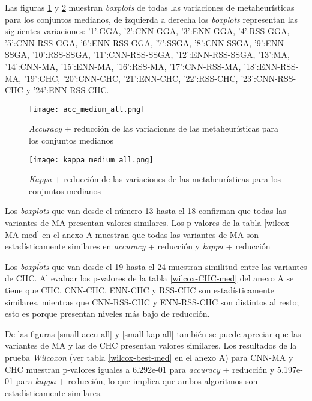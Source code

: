 Las figuras \ref{medium-accu-all} y \ref{medium-kap-all} muestran \emph{boxplots} de todas las variaciones de metaheurísticas para los conjuntos medianos, de izquierda a derecha los \emph{boxplots} representan las siguientes variaciones: '1':GGA, '2':CNN-GGA, '3':ENN-GGA, '4':RSS-GGA, '5':CNN-RSS-GGA, '6':ENN-RSS-GGA, '7':SSGA, '8':CNN-SSGA, '9':ENN-SSGA, '10':RSS-SSGA, '11':CNN-RSS-SSGA, '12':ENN-RSS-SSGA, '13':MA, '14':CNN-MA, '15':ENN-MA, '16':RSS-MA, '17':CNN-RSS-MA, '18':ENN-RSS-MA, '19':CHC, '20':CNN-CHC, '21':ENN-CHC, '22':RSS-CHC, '23':CNN-RSS-CHC y '24':ENN-RSS-CHC.

\begin{figure}[h!]

	\centering
	\texttt{[image: acc\_medium\_all.png]}

\caption{\emph{Accuracy} + reducción de las variaciones de las metaheurísticas para los conjuntos medianos}
\label{medium-accu-all}
\end{figure}


\begin{figure}[h!]

	\centering
	\texttt{[image: kappa\_medium\_all.png]}

\caption{\emph{Kappa} + reducción de las variaciones de las metaheurísticas para los conjuntos medianos}
\label{medium-kap-all}
\end{figure}

Los \emph{boxplots} que van desde el número 13 hasta el 18 confirman que todas las variantes de MA presentan valores similares. Los p-valores de la tabla \ref{wilcox-MA-med} en el anexo A muestran que todas las variantes de MA son estadísticamente similares en \emph{accuracy} + reducción y \emph{kappa} + reducción

Los \emph{boxpĺots} que van desde el 19 hasta el 24 muestran similitud entre las variantes de CHC. Al evaluar los p-valores de la tabla \ref{wilcox-CHC-med} del anexo A se tiene que CHC, CNN-CHC, ENN-CHC y RSS-CHC son estadísticamente similares, mientras que CNN-RSS-CHC y ENN-RSS-CHC son distintos al resto; esto es porque presentan niveles más bajo de reducción.

De las figuras \ref{small-accu-all} y \ref{small-kap-all} también se puede apreciar que las variantes de MA y las de CHC presentan valores similares. Los resultados de la prueba \emph{Wilcoxon} (ver tabla \ref{wilcox-best-med} en el anexo A) para CNN-MA y CHC muestran p-valores iguales a 6.292e-01 para \emph{accuracy} + reducción y 5.197e-01 para \emph{kappa} + reducción, lo que implica que ambos algoritmos son estadísticamente similares.

